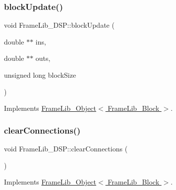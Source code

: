 \mbox{\label{class_frame_lib___d_s_p_aafa57c93417ced3d5610ca9f6b0f0913}} 
\subsubsection{\texorpdfstring{block\+Update()}{blockUpdate()}}
{\footnotesize\ttfamily void Frame\+Lib\+\_\+\+D\+S\+P\+::block\+Update (\begin{DoxyParamCaption}\item[{double $\ast$$\ast$}]{ins,  }\item[{double $\ast$$\ast$}]{outs,  }\item[{unsigned long}]{block\+Size }\end{DoxyParamCaption})\hspace{0.3cm}{\ttfamily [virtual]}}



Implements \hyperlink{class_frame_lib___object_a6efd81ab386e62400960471fa3cc94e7}{Frame\+Lib\+\_\+\+Object$<$ Frame\+Lib\+\_\+\+Block $>$}.

\mbox{\label{class_frame_lib___d_s_p_a42ab6ff22056a188a33ecadcd2ea477d}} 
\subsubsection{\texorpdfstring{clear\+Connections()}{clearConnections()}}
{\footnotesize\ttfamily void Frame\+Lib\+\_\+\+D\+S\+P\+::clear\+Connections (\begin{DoxyParamCaption}{ }\end{DoxyParamCaption})\hspace{0.3cm}{\ttfamily [virtual]}}



Implements \hyperlink{class_frame_lib___object_a5b219c0cb96a7b6b1f0c471f665337ec}{Frame\+Lib\+\_\+\+Object$<$ Frame\+Lib\+\_\+\+Block $>$}.

\mbox{\label{class_frame_lib___d_s_p_a811ee9a6e985621da2f849ce4a96b7ba}} 
